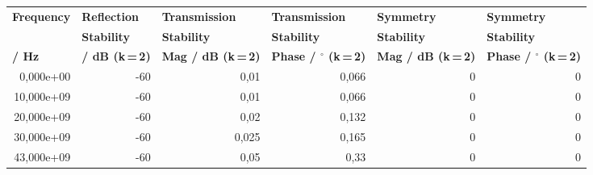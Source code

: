 \begin{longtable}{rrrrrr}
\multicolumn{1}{l}{\textbf{Frequency}} & \multicolumn{1}{l}{\textbf{Reflection}} & \multicolumn{1}{l}{\textbf{Transmission}} & \multicolumn{1}{l}{\textbf{Transmission}} & \multicolumn{1}{l}{\textbf{Symmetry}} & \multicolumn{1}{l}{\textbf{Symmetry}}\\
\multicolumn{1}{l}{\textbf{}} & \multicolumn{1}{l}{\textbf{Stability}} & \multicolumn{1}{l}{\textbf{Stability}} & \multicolumn{1}{l}{\textbf{Stability}} & \multicolumn{1}{l}{\textbf{Stability}} & \multicolumn{1}{l}{\textbf{Stability}}\\
\multicolumn{1}{l}{\textbf{/ Hz}} & \multicolumn{1}{l}{\textbf{/ dB (k\,=\,2)}} & \multicolumn{1}{l}{\textbf{Mag / dB (k\,=\,2)}} & \multicolumn{1}{l}{\textbf{Phase / $\mathbf{^{\circ}}$ (k\,=\,2)}} & \multicolumn{1}{l}{\textbf{Mag / dB (k\,=\,2)}} & \multicolumn{1}{l}{\textbf{Phase / $\mathbf{^{\circ}}$ (k\,=\,2)}}\\
\hline
\endhead
0,000e+00 & -60 & 0,01 & 0,066 & 0 & 0\\
10,000e+09 & -60 & 0,01 & 0,066 & 0 & 0\\
20,000e+09 & -60 & 0,02 & 0,132 & 0 & 0\\
30,000e+09 & -60 & 0,025 & 0,165 & 0 & 0\\
43,000e+09 & -60 & 0,05 & 0,33 & 0 & 0\\
\end{longtable}
